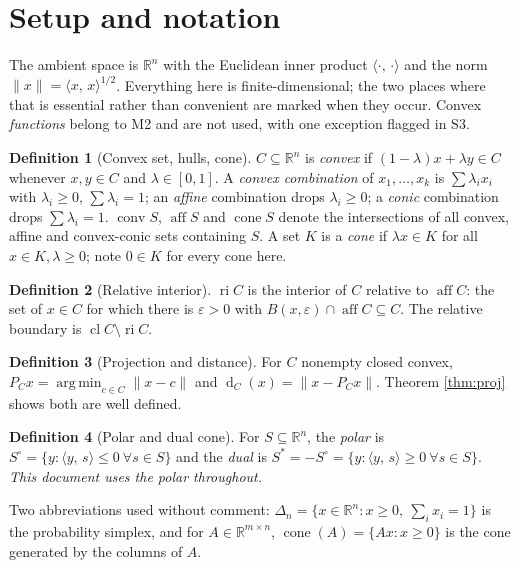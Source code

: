 \documentclass[11pt,a4paper]{article}
\theoremstyle{definition}
\newtheorem{definition}{Definition}
\theoremstyle{plain}
\theoremstyle{remark}
\newcommand{\R}{\mathbb{R}}
\newcommand{\ip}[2]{\langle #1,\, #2\rangle}
\newcommand{\norm}[1]{\lVert #1\rVert}
\newcommand{\proj}{P}
\DeclareMathOperator{\conv}{conv}
\DeclareMathOperator{\aff}{aff}
\DeclareMathOperator{\cone}{cone}
\DeclareMathOperator{\ri}{ri}
\DeclareMathOperator{\cl}{cl}
\DeclareMathOperator{\dist}{d}
\DeclareMathOperator*{\argmin}{arg\,min}
\newcommand{\Simplex}{\Delta}
\begin{document}
\section{Setup and notation}

The ambient space is $\R^n$ with the Euclidean inner product $\ip{\cdot}{\cdot}$ and the norm
$\norm{x}=\ip{x}{x}^{1/2}$. Everything here is finite-dimensional; the two places where that is
essential rather than convenient are marked when they occur. Convex \emph{functions} belong to
M2 and are not used, with one exception flagged in S3.

\begin{definition}[Convex set, hulls, cone]
\label{def:convex}
$C\subseteq\R^n$ is \emph{convex} if $(1-\lambda)x+\lambda y\in C$ whenever $x,y\in C$ and
$\lambda\in[0,1]$. A \emph{convex combination} of $x_1,\dots,x_k$ is $\sum\lambda_ix_i$ with
$\lambda_i\ge0$, $\sum\lambda_i=1$; an \emph{affine} combination drops $\lambda_i\ge0$; a
\emph{conic} combination drops $\sum\lambda_i=1$. $\conv S$, $\aff S$ and $\cone S$ denote the
intersections of all convex, affine and convex-conic sets containing $S$. A set $K$ is a
\emph{cone} if $\lambda x\in K$ for all $x\in K,\lambda\ge0$; note $0\in K$ for every cone here.
\end{definition}

\begin{definition}[Relative interior]
\label{def:ri}
$\ri C$ is the interior of $C$ relative to $\aff C$: the set of $x\in C$ for which there is
$\varepsilon>0$ with $B(x,\varepsilon)\cap\aff C\subseteq C$. The relative boundary is
$\cl C\setminus\ri C$.
\end{definition}

\begin{definition}[Projection and distance]
\label{def:proj}
For $C$ nonempty closed convex, $\proj_Cx=\argmin_{c\in C}\norm{x-c}$ and
$\dist_C(x)=\norm{x-\proj_Cx}$. Theorem \ref{thm:proj} shows both are well defined.
\end{definition}

\begin{definition}[Polar and dual cone]
\label{def:polar}
For $S\subseteq\R^n$, the \emph{polar} is $S^\circ=\{y:\ip{y}{s}\le0\ \forall s\in S\}$ and the
\emph{dual} is $S^*=-S^\circ=\{y:\ip{y}{s}\ge0\ \forall s\in S\}$. \emph{This document uses the
polar throughout.}
\end{definition}

Two abbreviations used without comment: $\Simplex_n=\{x\in\R^n:x\ge0,\ \sum_ix_i=1\}$ is the
probability simplex, and for $A\in\R^{m\times n}$, $\cone(A)=\{Ax:x\ge0\}$ is the cone generated
by the columns of $A$.
\end{document}
